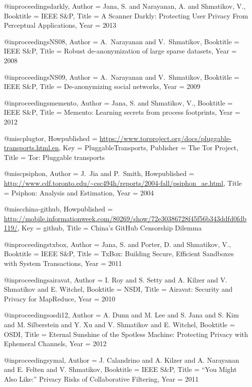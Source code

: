 {{@inproceedings{darkly,
	Author = {Jana, S. and Narayanan, A. and Shmatikov, V.},
	Booktitle = {IEEE S\&P},
	Title = {{A Scanner Darkly: Protecting User Privacy From Perceptual Applications}},
	Year = {2013}}

@inproceedings{NS08,
	Author = {A.~Narayanan and V.~Shmatikov},
	Booktitle = {IEEE S\&P},
	Title = {Robust de-anonymization of large sparse datasets},
	Year = {2008}}

@inproceedings{NS09,
	Author = {A.~Narayanan and V.~Shmatikov},
	Booktitle = {IEEE S\&P},
	Title = {De-anonymizing social networks},
	Year = {2009}}

@inproceedings{memento,
	Author = {Jana, S. and Shmatikov, V.},
	Booktitle = {IEEE S\&P},
	Title = {{Memento: Learning secrets from process footprints}},
	Year = {2012}}

@misc{plugtor,
	Howpublished = {\url{https://www.torproject.org/docs/pluggable-transports.html.en}},
	Key = {PluggableTransports},
	Publisher = {The Tor Project},
	Title = {{Tor: Pluggable transports}}}

@misc{psiphon,
	Author = {J.~Jia and P.~Smith},
	Howpublished = {\url{http://www.cdf.toronto.edu/~csc494h/reports/2004-fall/psiphon_ae.html}},
	Title = {{Psiphon: Analysis and Estimation}},
	Year = 2004}

@misc{china-github,
	Howpublished = {\url{http://mobile.informationweek.com/80269/show/72e30386728f45f56b343ddfd0fdb119/}},
	Key = {github},
	Title = {{China's GitHub Censorship Dilemma}}}

@inproceedings{txbox,
	Author = {Jana, S. and Porter, D. and Shmatikov, V.},
	Booktitle = {IEEE S\&P},
	Title = {{TxBox: Building Secure, Efficient Sandboxes with System Transactions}},
	Year = {2011}}

@inproceedings{airavat,
	Author = {I. Roy and S. Setty and A. Kilzer and V. Shmatikov and E. Witchel},
	Booktitle = {NSDI},
	Title = {{Airavat: Security and Privacy for MapReduce}},
	Year = {2010}}

@inproceedings{osdi12,
	Author = {A. Dunn and M. Lee and S. Jana and S. Kim and M. Silberstein and Y. Xu and V. Shmatikov and E. Witchel},
	Booktitle = {OSDI},
	Title = {{Eternal Sunshine of the Spotless Machine: Protecting Privacy with Ephemeral Channels}},
	Year = {2012}}

@inproceedings{ymal,
	Author = {J. Calandrino and A. Kilzer and A. Narayanan and E. Felten and V. Shmatikov},
	Booktitle = {IEEE S\&P},
	Title = {{``You Might Also Like:'' Privacy Risks of Collaborative Filtering}},
	Year = {2011}}

}}
